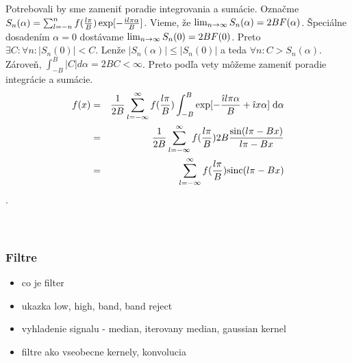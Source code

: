 \begin{dokaz}
    Potrebovali by sme zameniť poradie integrovania a sumácie.
    Označme $S_n(\alpha) = \sum_{l=-n}^{n} f(\frac{l \pi}{B})
    \exp[-\frac{\hat{\imath} l \pi \alpha}{B}]$.
    Vieme, že $\lim_{n\rightarrow \infty} S_n(\alpha) = 2 B F(\alpha)$.
    Špeciálne dosadením $\alpha=0$ dostávame
     $\lim_{n \rightarrow \infty} S_n(0) = 2 B F(0)$.
     Preto $\exists C: \forall n: |S_n(0)| < C$.
     Lenže $|S_n(\alpha)| \le |S_n(0)|$ a teda $\forall n: C >
     S_n(\alpha)$.
     Zároveň, $\int_{-B}^B |C| d\alpha = 2 B C < \infty$.
     Preto podľa vety 
     môžeme zameniť poradie integrácie a sumácie.     
    \begin{eqnarray}
       f(x) & = & \frac{1}{2B}  \sum_{l=-\infty}^{\infty} 
                f(\frac{l \pi}{B}) \int_{-B}^{B} 
                \exp[-\frac{\hat{\imath} l \pi \alpha}{B}
                + \hat{\imath} x \alpha] \; \mathrm{d}\alpha \\
            & = & \frac{1}{2B} \sum_{l=-\infty}^{\infty}
                f(\frac{l \pi}{B}) 2B \frac{\sin(l \pi - B x)}{l \pi -
                B x} \\
            & = & \sum_{l=-\infty}^{\infty}
                f(\frac{l \pi}{B})  {\rm sinc}(l \pi - B x)
    \end{eqnarray}
    . \\
    \todo{} \\
    \todo{} \\
    \todo{}
\end{dokaz}


\subsubsection{Filtre}

\begin{itemize}
    \item co je filter
    \item ukazka low, high, band, band reject
    \item vyhladenie signalu - median, iterovany median, gaussian
    kernel
    \item filtre ako vseobecne kernely, konvolucia
\end{itemize}
